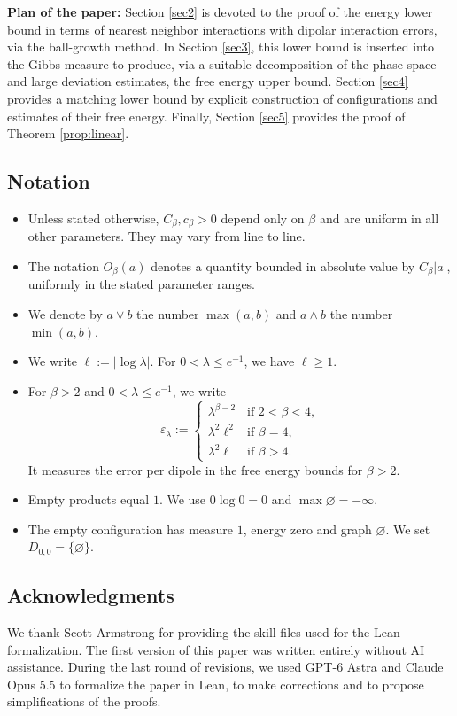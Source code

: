 \documentclass[a4paper,10pt,leqno]{amsart}
\numberwithin{equation}{section}
\begin{document}
\medskip

\textbf{Plan of the paper:} Section \ref{sec2} is devoted to the proof of the energy lower bound in terms of nearest neighbor interactions with dipolar interaction errors, via the ball-growth method. In Section \ref{sec3}, this lower bound is inserted into the Gibbs measure to produce, via a suitable decomposition of the phase-space and large deviation estimates, the free energy upper bound.
Section \ref{sec4} provides a matching lower bound by explicit construction of configurations and estimates of their free energy. Finally, Section \ref{sec5} provides the proof of Theorem \ref{prop:linear}.

\subsection{Notation}\label{subsec:notation}
\begin{itemize}
  \item Unless stated otherwise, $C_\beta,c_\beta>0$ depend only on $\beta$ and are uniform in all other parameters. They may vary from line to line.
  \item The notation $O_\beta(a)$ denotes a quantity bounded in absolute value by $C_\beta|a|$, uniformly in the stated parameter ranges.
  \item We denote by $a\vee b$ the number $\max(a,b)$ and $a \wedge b$ the number $\min (a,b)$.
  \item We write $\ell:=|\log\lambda|$. For $0<\lambda\le e^{-1}$, we have $\ell\ge1$.
  \item For $\beta>2$ and $0<\lambda\le e^{-1}$, we write
  \[
    \varepsilon_\lambda:=\begin{cases}
      \lambda^{\beta-2}&\text{if $2<\beta<4$},\\
      \lambda^2\ell^2&\text{if $\beta=4$},\\
      \lambda^2\ell&\text{if $\beta>4$}.
    \end{cases}
  \]
  It measures the error per dipole in the free energy bounds for $\beta>2$.
  \item Empty products equal $1$. We use $0\log0=0$ and $\max\varnothing=-\infty$.
  \item The empty configuration has measure $1$, energy zero and graph $\varnothing$. We set $D_{0,0}=\{\varnothing\}$.
\end{itemize}

\subsection*{Acknowledgments}
We thank Scott Armstrong for providing the skill files used for the Lean formalization. The first version of this paper was written entirely without AI assistance. During the last round of revisions, we used GPT-6 Astra and Claude Opus 5.5 to formalize the paper in Lean, to make corrections and to propose simplifications of the proofs.
\end{document}
